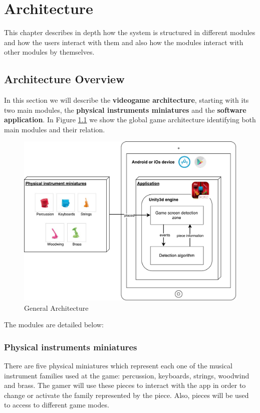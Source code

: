 \chapter{Architecture}
\label{chap:architecture}


\begin{chapterintro}
This chapter describes in depth how the system is structured in different modules and how the users interact with them and also how the modules interact with other modules by themselves.
\end{chapterintro}

\cleardoublepage
\section{Architecture Overview}
In this section we will describe the \textbf{videogame architecture}, starting with its two main modules, the \textbf{physical instruments miniatures} and the \textbf{software application}. In Figure \ref{fig:ArchitectureGeneral} we show the global game architecture identifying both main modules and their relation.

\begin{figure}[ht!]
	\centering
	\includegraphics[width=400pt]{graphics/ArchitectureGeneral.pdf}
	\caption{General Architecture}
	\label{fig:ArchitectureGeneral}
\end{figure}

\FloatBarrier

The modules are detailed below:

\subsection{Physical instruments miniatures}
There are five physical miniatures which represent each one of the musical instrument families used at the game: percussion, keyboards, strings, woodwind and brass. The gamer will use these pieces to interact with the app in order to change or activate the family represented by the piece. Also, pieces will be used to access to different game modes.

